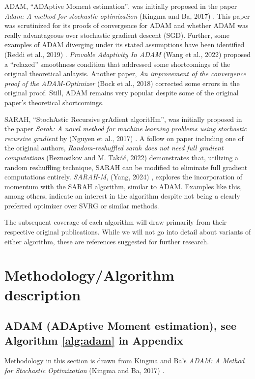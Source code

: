 \documentclass[letterpaper,11 pt]{article}
\begin{document}
ADAM, “ADAptive Moment estimation”, was initially proposed in the paper \textit{Adam: A method for stochastic optimization} (Kingma and Ba, 2017) \cite{kingma}.  This paper was scrutinized for its proofs of convergence for ADAM and whether ADAM was really advantageous over stochastic gradient descent (SGD).  Further, some examples of ADAM diverging under its stated assumptions have been identified (Reddi et al., 2019) \cite{reddidivergence}.  \textit{Provable Adaptivity In ADAM} (Wang et al., 2022) \cite{wangprovable} proposed a “relaxed” smoothness condition that addressed some shortcomings of the original theoretical anlaysis.  Another paper, \textit{An improvement of the convergence proof of the ADAM-Optimizer} (Bock et al., 2018) \cite{inproceedings} corrected some errors in the original proof.  Still, ADAM remains very popular despite some of the original paper's theoretical shortcomings. 

SARAH, “StochAstic Recursive grAdient algoritHm”, was initially proposed in the paper \textit{Sarah: A novel method for machine learning problems using stochastic recursive gradient} by (Nguyen et al., 2017) \cite{nguyen}.  A follow on paper including  one of the original authors, \textit{Random-reshuffled sarah does not need full gradient computations} (Beznosikov and M. Takáč, 2022) \cite{Beznosikov} demonstrates that, utilizing a random reshuffling technique, SARAH can be modified to eliminate full gradient computations entirely.  \textit{SARAH-M}, (Yang, 2024) \cite{sarahm}, explores the incorporation of momentum with the SARAH algorithm, similar to ADAM.  Examples like this, among others, indicate an interest in the algorithm despite not being a clearly preferred optimizer over SVRG or similar methods.

The subsequent coverage of each algorithm will draw primarily from their respective original publications. While we will not go into detail about variants of either algorithm, these are references suggested for further research.




\section{Methodology/Algorithm description}\label{sec:method}

\subsection{ ADAM (ADAptive Moment estimation), see Algorithm \ref{alg:adam} in Appendix}
Methodology in this section is drawn from Kingma and Ba's \textit{ADAM: A Method for Stochastic Optimization} (Kingma and Ba, 2017)  \cite{kingma}.
\end{document}
